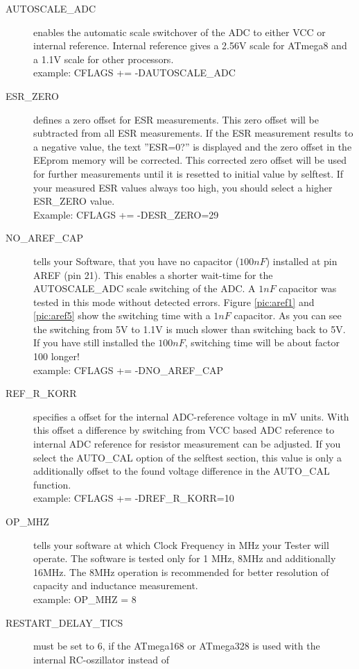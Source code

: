 \begin{description}
  \item[AUTOSCALE\_ADC] enables the automatic scale switchover of the ADC to either VCC or internal reference.
Internal reference gives a 2.56V scale for ATmega8 and a 1.1V scale for other processors.\\
example: CFLAGS += -DAUTOSCALE\_ADC
  \item[ESR\_ZERO] defines a zero offset for ESR measurements.
This zero offset will be subtracted from all ESR measurements.
If the ESR measurement results to a negative value, the text ''ESR=0?'' is displayed and the zero offset
in the EEprom memory will be corrected.
This corrected zero offset will be used for further measurements until it is resetted to initial value by selftest.
If your measured ESR values always too high, you should select a higher ESR\_ZERO value.\\
Example: CFLAGS += -DESR\_ZERO=29
  \item[NO\_AREF\_CAP] tells your Software, that you have no capacitor (\(100 nF\)) installed at pin AREF (pin 21).
This enables a shorter wait-time for the AUTOSCALE\_ADC scale switching of the ADC.
A \(1 nF\) capacitor was tested in this mode without detected errors.
Figure \ref{pic:aref1} and \ref{pic:aref5} show the switching time with a \(1 nF\) capacitor.
As you can see the switching from 5V to 1.1V is much slower than switching back to 5V. If you
have still installed the \(100 nF\), switching time will be about factor 100 longer!\\
example: CFLAGS += -DNO\_AREF\_CAP
  \item[REF\_R\_KORR] specifies a offset for the internal ADC-reference voltage in mV units.
With this offset a difference by switching from VCC based ADC reference to internal ADC reference for resistor measurement can be adjusted.
If you select the AUTO\_CAL option of the selftest section, this value is only a additionally offset to the found voltage 
difference in the AUTO\_CAL function.\\
example: CFLAGS += -DREF\_R\_KORR=10
  \item[OP\_MHZ] tells your software at which Clock Frequency in MHz your Tester will operate.
The software is tested only for 1 MHz, 8MHz and additionally 16MHz. 
The 8MHz operation is recommended for better resolution of capacity and inductance measurement.\\
example: OP\_MHZ = 8
  \item[RESTART\_DELAY\_TICS] must be set to 6, if the ATmega168 or ATmega328 is used with the internal RC-oszillator instead of

\end{description}
